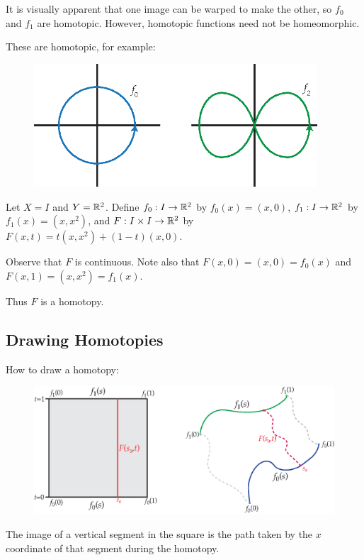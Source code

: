 It is visually apparent that one image can be warped to make the other, so $f_0$ and $f_1$ are homotopic. However, homotopic functions need not be homeomorphic. 

These are homotopic, for example:
\begin{figure}[ht!]
    \centering
    \includegraphics[width=300pt]{images/homotopy/circle_and_infty}
\end{figure}
 
\begin{example}
	Let $X = I$ and $Y = \mathbb R^2$. Define $f_0: I \rightarrow \mathbb R^2$ by $f_0(x) = (x,0)$, $f_1: I \rightarrow \mathbb R^2$ by $f_1(x) = (x,x^2)$, and $F: I \times I \rightarrow \mathbb R^2$ by $F(x, t) = t(x, x^2) + (1-t)(x, 0)$.
	
	Observe that $F$ is continuous. Note also that $F(x,0) = (x, 0) = f_0(x)$ and $F(x,1) = (x, x^2) = f_1(x)$.
	
	Thus $F$ is a homotopy. 
\end{example}

\subsection{Drawing Homotopies}

How to draw a homotopy: 
\begin{figure}[ht!]
    \centering
    \includegraphics[width=350pt]{images/homotopy/how_to_homotope}
\end{figure}

The image of a vertical segment in the square is the path taken by the $x$ coordinate of that segment during the homotopy.

